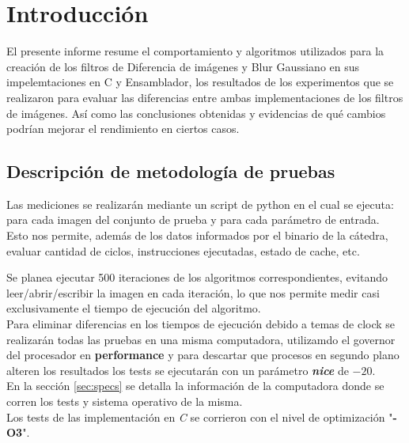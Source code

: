 \section{Introducci\'on}
El presente informe resume el comportamiento y algoritmos utilizados para la creaci\'on de los filtros de Diferencia de im\'agenes y Blur Gaussiano en sus impelemtaciones en C y Ensamblador, los resultados de los experimentos que se realizaron para evaluar las diferencias entre ambas
implementaciones de los filtros de im\'agenes. As\'i como las conclusiones obtenidas y evidencias de qu\'e cambios podr\'ian mejorar el rendimiento en ciertos casos.

\subsection{Descripci\'on de metodolog\'ia de pruebas}
Las mediciones se realizar\'an mediante un script de python en el cual se ejecuta: \\
para cada imagen del conjunto de prueba y para cada par\'ametro de entrada. \\
Esto nos permite, adem\'as de los datos informados por el binario de la c\'atedra, evaluar cantidad de ciclos, instrucciones ejecutadas, estado de cache, etc.

Se planea ejecutar 500 iteraciones de los algoritmos correspondientes, evitando leer/abrir/escribir la imagen en cada iteraci\'on, lo que nos permite medir casi exclusivamente el tiempo de ejecuci\'on del algoritmo. \\
Para eliminar diferencias en los tiempos de ejecuci\'on debido a temas de clock se realizar\'an todas las pruebas en una misma computadora, utilizamdo el governor del procesador en \textbf{performance} y para descartar que procesos en segundo plano alteren los resultados los tests se ejecutar\'an con un par\'ametro \textbf{\textit{nice}} de $-20$. \\
En la secci\'on \ref{sec:specs} se detalla la informaci\'on de la computadora donde se corren los tests y sistema operativo de la misma. \\
Los tests de las implementaci\'on en \emph{C} se corrieron con el nivel de optimizaci\'on "\textbf{-O3}".

